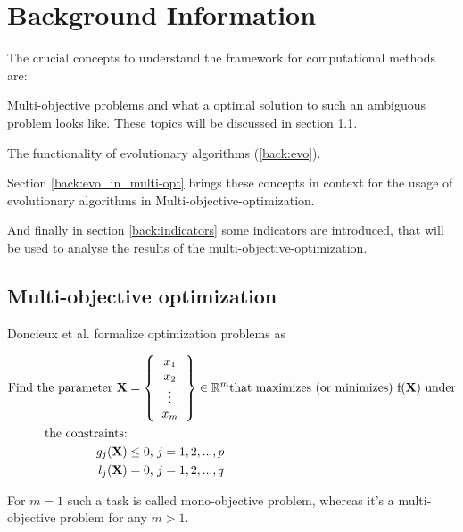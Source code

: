 \documentclass[12pt,twoside]{article}
\theoremstyle{plain}
\theoremstyle{definition}
\theoremstyle{remark}
\begin{document}
\section{Background Information}
\label{sec:background}
The crucial concepts to understand the framework for computational methods are:

Multi-objective problems and what a optimal solution to such an ambiguous problem looks like. These topics will be discussed in section \ref{back:multi-opt}.
 
The functionality of evolutionary algorithms (\ref{back:evo}).

Section \ref{back:evo_in_multi-opt} brings these concepts in context for the usage of evolutionary algorithms in Multi-objective-optimization.

And finally in section \ref{back:indicators} some indicators are introduced, that will be used to analyse the results of the multi-objective-optimization.

\subsection{Multi-objective optimization}
\label{back:multi-opt}
Doncieux et al. \cite{doncieux2015multi} formalize optimization problems as

\begin{align*}
	\text{Find the parameter }\textbf{X} &=
	\left \{
	\begin{tabular}{c}
		$x_1$\\
		$x_2$\\
		\vdots\\
		$x_m$
	\end{tabular}
	\right \}
	\in \mathbb{R}^m \text{that maximizes (or minimizes) f(\textbf{X}) under}\\
		 \text{the constraints:}\\
	g_j(\textbf{X}) &\le 0 \text{,  } j = 1,2,... ,p\\
	l_j(\textbf{X}) &= 0 \text{,  } j = 1,2,... ,q
\end{align*}

For $m = 1$ such a task is called mono-objective problem, whereas it's a multi-objective problem for any $m > 1$.
\end{document}
